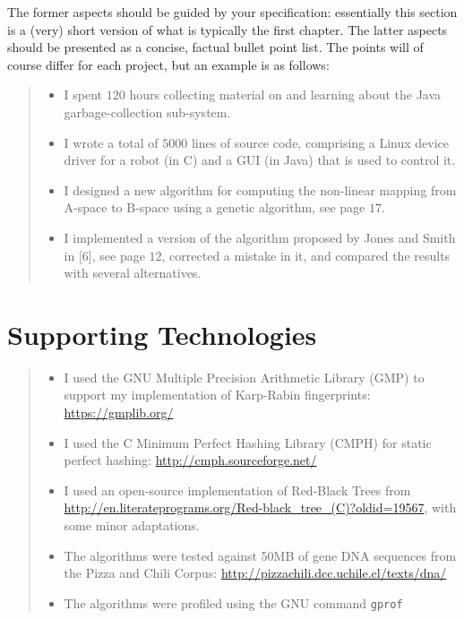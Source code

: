 \documentclass[ %
                    author={Dominic Joseph Moylett},
                    degree={MEng},
                     title={Dictionary Matching with Fingerprints},
                  subtitle={An Empirical Analysis},
                      type={research},
                      year={2015} ]{dissertation}
\begin{document}
The former aspects should be guided by your specification: essentially 
this section is a (very) short version of what is typically the first 
chapter.  The latter aspects should be presented as a concise, factual 
bullet point list.  The points will of course differ for each project, 
but an example is as follows:

\begin{quote}
\noindent
\begin{itemize}
\item I spent $120$ hours collecting material on and learning about the 
      Java garbage-collection sub-system. 
\item I wrote a total of $5000$ lines of source code, comprising a Linux 
      device driver for a robot (in C) and a GUI (in Java) that is 
      used to control it.
\item I designed a new algorithm for computing the non-linear mapping 
      from A-space to B-space using a genetic algorithm, see page $17$.
\item I implemented a version of the algorithm proposed by Jones and 
      Smith in [6], see page $12$, corrected a mistake in it, and 
      compared the results with several alternatives.
\end{itemize}
\end{quote}

\chapter*{Supporting Technologies}
\label{ch:supporting-tech}

\begin{quote}
\begin{itemize}
\item I used the GNU Multiple Precision Arithmetic Library (GMP) to support my implementation of Karp-Rabin fingerprints: \url{https://gmplib.org/}
\item I used the C Minimum Perfect Hashing Library (CMPH) for static perfect hashing: \url{http://cmph.sourceforge.net/}
\item I used an open-source implementation of Red-Black Trees from \url{http://en.literateprograms.org/Red-black_tree_(C)?oldid=19567}, with some minor adaptations.
\item The algorithms were tested against 50MB of gene DNA sequences from the Pizza and Chili Corpus: \url{http://pizzachili.dcc.uchile.cl/texts/dna/}
\item The algorithms were profiled using the GNU command \texttt{gprof}
\end{itemize}
\end{quote}
\end{document}
